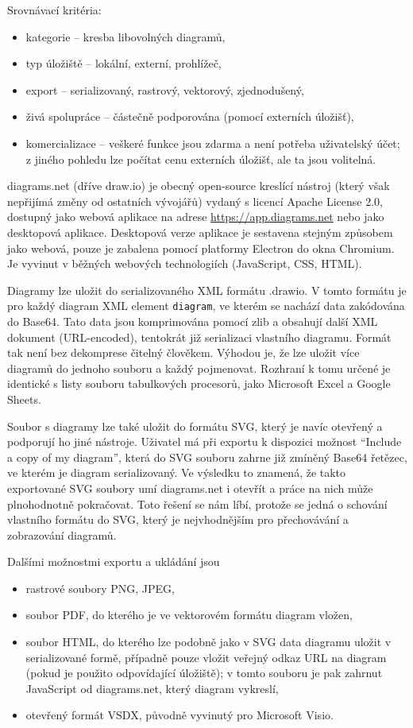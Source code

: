 Srovnávací kritéria:
\begin{itemize}
  \item kategorie -- kresba libovolných diagramů,
  \item typ úložiště -- lokální, externí, prohlížeč,
  \item export -- serializovaný, rastrový, vektorový, zjednodušený,
  \item živá spolupráce -- částečně podporována (pomocí externích úložišť),
  \item komercializace -- veškeré funkce jsou zdarma a není potřeba uživatelský
  účet; z jiného pohledu lze počítat cenu externích úložišť, ale ta jsou
  volitelná.
\end{itemize}

diagrams.net (dříve draw.io) je obecný open-source kreslící nástroj (který však
nepřijímá změny od ostatních vývojářů) vydaný s licencí Apache License 2.0,
dostupný jako webová aplikace na adrese \url{https://app.diagrams.net} nebo jako
desktopová aplikace. Desktopová verze aplikace je sestavena stejným způsobem
jako webová, pouze je zabalena pomocí platformy Electron do okna Chromium. Je
vyvinut v běžných we\-bo\-vých tech\-no\-lo\-gi\-ích (Java\-Script, CSS, HTML).

Diagramy lze uložit do serializovaného XML formátu .drawio. V tomto formátu je
pro každý diagram XML element \texttt{diagram}, ve kterém se nachází data
zakódována do Base64. Tato data jsou komprimována pomocí zlib a obsahují další
XML dokument (URL-encoded), tentokrát již serializaci vlastního diagramu. Formát
tak není bez dekomprese čitelný člověkem. Výhodou je, že lze uložit více
diagramů do jednoho souboru a každý pojmenovat. Rozhraní k tomu určené je
identické s listy souboru tabulkových procesorů, jako Microsoft Excel a Google
Sheets.

Soubor s diagramy lze také uložit do formátu SVG, který je navíc otevřený a
podporují ho jiné nástroje. Uživatel má při exportu k dispozici možnost
``Include a copy of my diagram'', která do SVG souboru zahrne již zmíněný Base64
řetězec, ve kterém je diagram serializovaný. Ve výsledku to znamená, že takto
exportované SVG soubory umí diagrams.net i otevřít a práce na nich může
plnohodnotně pokračovat. Toto řešení se nám líbí, protože se jedná o schování
vlastního formátu do SVG, který je nejvhodnějším pro přechovávání a zobrazování
diagramů.

Dalšími možnostmi exportu a ukládání jsou
\begin{itemize}
  \item rastrové soubory PNG, JPEG,
  \item soubor PDF, do kterého je ve vektorovém formátu diagram vložen,
  \item soubor HTML, do kterého lze podobně jako v SVG data diagramu uložit v
  serializované formě, případně pouze vložit veřejný odkaz URL na diagram (pokud
  je použito odpovídající úložiště); v tomto souboru je pak zahrnut JavaScript
  od diagrams.net, který diagram vykreslí,
  \item otevřený formát VSDX, původně vyvinutý pro Microsoft Visio.
\end{itemize}

